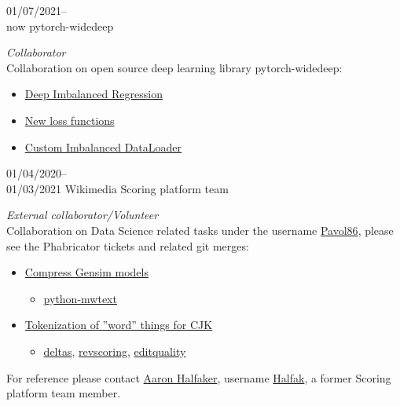 \documentclass[]{friggeri-cv} %
\begin{document}
\begin{entrylist}

\entry
{01/07/2021--\\now}
{pytorch-widedeep}
{}
{\emph{Collaborator}\\
Collaboration on open source deep learning library pytorch-widedeep:
\begin{itemize}
	\item \href{https://github.com/jrzaurin/pytorch-widedeep/pull/77}{Deep Imbalanced Regression}
	\item \href{https://github.com/jrzaurin/pytorch-widedeep/pull/62}{New loss functions}
	\item \href{https://github.com/jrzaurin/pytorch-widedeep/pull/42}{Custom Imbalanced DataLoader}
\end{itemize}
}

\entry
{01/04/2020--\\01/03/2021}
{Wikimedia Scoring platform team}
{}
{\emph{External collaborator/Volunteer}\\
Collaboration on Data Science related tasks under the username \href{https://phabricator.wikimedia.org/p/Pavol86/}{Pavol86}, please see the Phabricator tickets and related git merges:
\begin{itemize}
	\item \href{https://phabricator.wikimedia.org/T111179}{Compress Gensim models}
	\begin{itemize}
		\item \href{https://github.com/mediawiki-utilities/python-mwtext/pull/8}{python-mwtext}
	\end{itemize}
	\item \href{https://phabricator.wikimedia.org/T247523\#6200697}{Tokenization of ”word” things for CJK}
	\begin{itemize}
		\item \href{https://github.com/halfak/deltas/issues?q=assignee\%3A5uperpalo+is\%3Aall}{deltas}, \href{https://github.com/wikimedia/revscoring/pulls?q=assignee\%3A5uperpalo+is\%3Aall+}{revscoring}, \href{https://github.com/wikimedia/editquality/pulls?q=assignee\%3A5uperpalo+is\%3Aall+}{editquality}
	\end{itemize}
\end{itemize}
For reference please contact \faEnvelopeO \href{mailto:aaron.halfaker@gmail.com}{Aaron Halfaker}, username \href{https://phabricator.wikimedia.org/p/Halfak/}{Halfak}, a former Scoring platform team member.
}

\end{entrylist}
\end{document}
